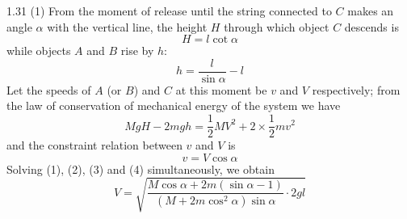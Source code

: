 \begin{solution}{1.31}
(1) From the moment of release until the string connected to $C$ makes an angle $\alpha$ with the vertical line, the height $H$ through which object $C$ descends is
\begin{equation}
H=l\cot\alpha \tag{1}
\end{equation}
while objects $A$ and $B$ rise by $h$:
\begin{equation}
h=\frac{l}{\sin\alpha}-l \tag{2}
\end{equation}
Let the speeds of $A$ (or $B$) and $C$ at this moment be $v$ and $V$ respectively; from the law of conservation of mechanical energy of the system we have
\begin{equation}
MgH-2mgh=\frac{1}{2}MV^2+2\times\frac{1}{2}mv^2 \tag{3}
\end{equation}
and the constraint relation between $v$ and $V$ is
\begin{equation}
v=V\cos\alpha \tag{4}
\end{equation}
Solving (1), (2), (3) and (4) simultaneously, we obtain
\begin{equation}
V=\sqrt{\frac{M\cos\alpha+2m(\sin\alpha-1)}{(M+2m\cos^2\alpha)\sin\alpha}\cdot 2gl} \tag{5}
\end{equation}


\end{solution}
